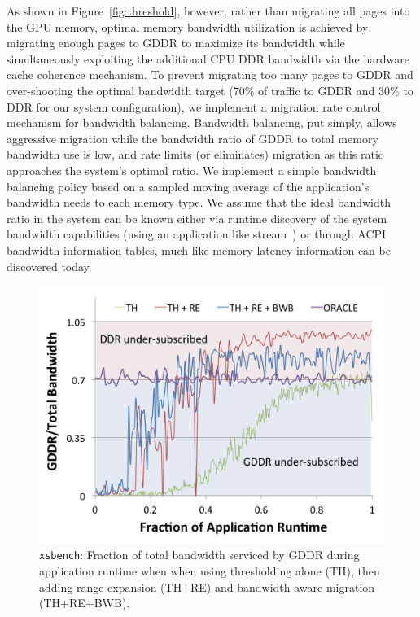 As shown in Figure~\ref{fig:threshold}, however, rather than migrating all pages into the GPU memory,
optimal memory bandwidth utilization is achieved by migrating enough pages to GDDR to maximize its bandwidth while
simultaneously exploiting the additional CPU DDR bandwidth via the hardware cache coherence mechanism.  To prevent
migrating too many pages to GDDR and over-shooting the optimal bandwidth target (70\% of
traffic to GDDR and 30\% to DDR for our system configuration), we implement a migration rate control
mechanism for bandwidth balancing.  Bandwidth balancing, put simply, allows aggressive migration while
the bandwidth ratio of GDDR to total memory bandwidth use is low, and rate limits (or eliminates) migration
as this ratio approaches the system's optimal ratio.
We implement a simple bandwidth balancing policy based on a sampled moving average of the
application's bandwidth needs to each memory type.  We assume that the ideal bandwidth ratio in the system can be known either
via runtime discovery of the system bandwidth capabilities (using an application like stream~\cite{stream_benchmark})
or through ACPI bandwidth information tables, much like memory latency information can be discovered today.

\begin{figure}[t]
\centering
    \includegraphics[width=0.9\columnwidth]{hpca2015/figures/xsbench-bw-ratio.png}
    \caption{{\tt xsbench}: Fraction of total bandwidth serviced by GDDR during application
runtime when when using thresholding alone (TH), then adding range expansion
(TH+RE) and bandwidth aware migration (TH+RE+BWB).}
    \label{fig:migrationlimiting-xsbench}
\end{figure}

